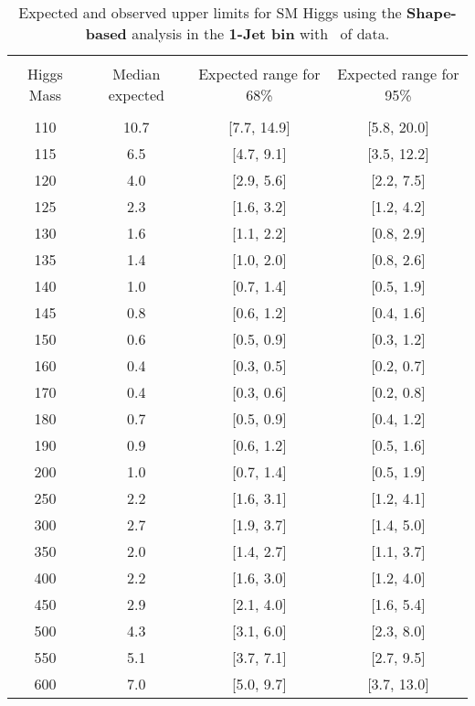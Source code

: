 \begin{table}[hbp!]
\begin{center}
\begin{tabular}{c c c c}
\hline
\vspace{-3mm} && \\
 Higgs Mass   & Median expected & Expected range for 68\% & Expected range for 95\%   \\
\vspace{-3mm} && \\
\hline
110 & 10.7 & [7.7, 14.9] & [5.8, 20.0] \\
115 & 6.5 & [4.7, 9.1] & [3.5, 12.2] \\
120 & 4.0 & [2.9, 5.6] & [2.2, 7.5] \\
125 & 2.3 & [1.6, 3.2] & [1.2, 4.2] \\
130 & 1.6 & [1.1, 2.2] & [0.8, 2.9] \\
135 & 1.4 & [1.0, 2.0] & [0.8, 2.6] \\
140 & 1.0 & [0.7, 1.4] & [0.5, 1.9] \\
145 & 0.8 & [0.6, 1.2] & [0.4, 1.6] \\
150 & 0.6 & [0.5, 0.9] & [0.3, 1.2] \\
160 & 0.4 & [0.3, 0.5] & [0.2, 0.7] \\
170 & 0.4 & [0.3, 0.6] & [0.2, 0.8] \\
180 & 0.7 & [0.5, 0.9] & [0.4, 1.2] \\
190 & 0.9 & [0.6, 1.2] & [0.5, 1.6] \\
200 & 1.0 & [0.7, 1.4] & [0.5, 1.9] \\
250 & 2.2 & [1.6, 3.1] & [1.2, 4.1] \\
300 & 2.7 & [1.9, 3.7] & [1.4, 5.0] \\
350 & 2.0 & [1.4, 2.7] & [1.1, 3.7] \\
400 & 2.2 & [1.6, 3.0] & [1.2, 4.0] \\
450 & 2.9 & [2.1, 4.0] & [1.6, 5.4] \\
500 & 4.3 & [3.1, 6.0] & [2.3, 8.0] \\
550 & 5.1 & [3.7, 7.1] & [2.7, 9.5] \\
600 & 7.0 & [5.0, 9.7] & [3.7, 13.0] \\
\hline
\end{tabular}
\caption{Expected and observed upper limits for SM Higgs using the
  {\bf Shape-based} analysis in the {\bf 1-Jet bin} with \intlumiEightTeV\ of data.}
\label{tab:bdtbase_uls_1j}
\end{center}
\end{table}
